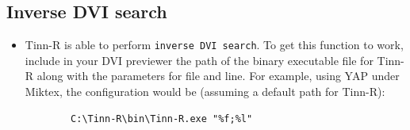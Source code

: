 \subsection{Inverse DVI search}

\begin{itemize}
  \item Tinn-R is able to perform \texttt{inverse DVI search}. To get this
    function to work, include in your DVI previewer the path of the
    binary executable file for Tinn-R along with the parameters for
    file and line.  For example, using YAP under Miktex, the configuration
    would be (assuming a default path for Tinn-R):

    \begin{footnotesize}
      \begin{verbatim}
        C:\Tinn-R\bin\Tinn-R.exe "%f;%l"
      \end{verbatim}
    \end{footnotesize}


\end{itemize}
